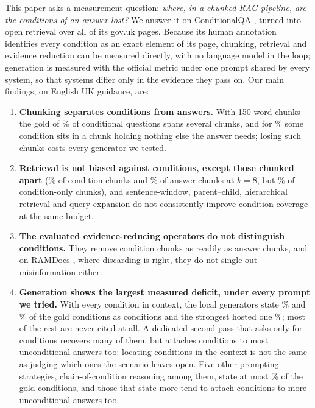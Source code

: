 This paper asks a measurement question: \emph{where, in a chunked RAG pipeline, are the conditions of an answer lost?} We answer it on ConditionalQA \cite{sun2022conditionalqa}, turned into open retrieval over all \nPages{} of its gov.uk pages. Because its human annotation identifies every condition as an exact element of its page, chunking, retrieval and evidence reduction can be measured directly, with no language model in the loop; generation is measured with the official metric under one prompt shared by every system, so that systems differ only in the evidence they pass on. Our main findings, on English UK guidance, are:
\begin{enumerate}[(1)]
\item \textbf{Chunking separates conditions from answers.} With 150-word chunks the gold of \sepCond\% of conditional questions spans several chunks, and for \condOnly\% some condition sits in a chunk holding nothing else the answer needs; losing such chunks costs every generator we tested.
\item \textbf{Retrieval is not biased against conditions, except those chunked apart} (\recCondEight\% of condition chunks and \recAnsEight\% of answer chunks at $k=8$, but \recCondOnlyEight\% of condition-only chunks), and sentence-window, parent--child, hierarchical retrieval and query expansion do not consistently improve condition coverage at the same budget.
\item \textbf{The evaluated evidence-reducing operators do not distinguish conditions.} They remove condition chunks as readily as answer chunks, and on RAMDocs \cite{wang2025madam}, where discarding is right, they do not single out misinformation either.
\item \textbf{Generation shows the largest measured deficit, under every prompt we tried.} With every condition in context, the local generators state \recallGoldQwen\% and \recallGoldLlama\% of the gold conditions as conditions and the strongest hosted one \hRecallNemo\%; most of the rest are never cited at all. A dedicated second pass that asks only for conditions recovers many of them, but attaches conditions to most unconditional answers too: locating conditions in the context is not the same as judging which ones the scenario leaves open. Five other prompting strategies, chain-of-condition reasoning among them, state at most \prMaxRecall\% of the gold conditions, and those that state more tend to attach conditions to more unconditional answers too.
\end{enumerate}

